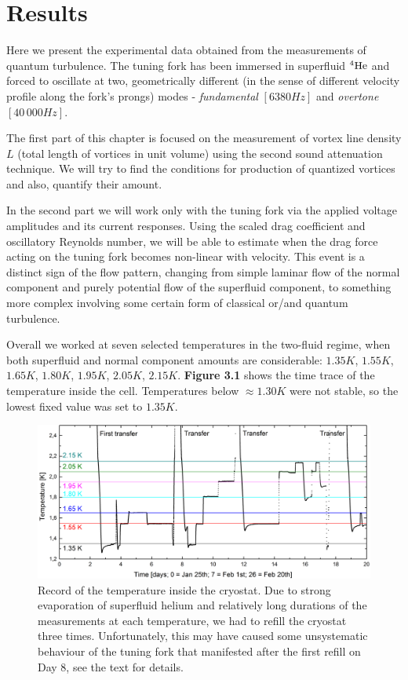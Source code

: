 \newpage

\chapter{Results}

Here we present the experimental data obtained from the measurements of quantum turbulence. The tuning fork has been immersed in superfluid ${}^4\mathrm{He}$ and forced to oscillate at two, geometrically different (in the sense of different velocity profile along the fork's prongs) modes - \textit{fundamental} $ [6380\unit{Hz}] $ and \textit{overtone} $ [40\,000\unit{Hz}] $.

The first part of this chapter is focused on the measurement of vortex line density $ L $ (total length of vortices in unit volume) using the second sound attenuation technique. We will try to find the conditions for production of quantized vortices and also, quantify their amount.

In the second part we will work only with the tuning fork via the applied voltage amplitudes and its current responses. Using the scaled drag coefficient and oscillatory Reynolds number, we will be able to estimate when the drag force acting on the tuning fork becomes non-linear with velocity. This event is a distinct sign of the flow pattern, changing from simple laminar flow of the normal component and purely potential flow of the superfluid component, to something more complex involving some certain form of classical or/and quantum turbulence.

Overall we worked at seven selected temperatures in the two-fluid regime, when both superfluid and normal component amounts are considerable: $ 1.35\unit{K} $, $ 1.55\unit{K} $, $ 1.65\unit{K} $, $ 1.80\unit{K} $, $ 1.95\unit{K} $, $ 2.05\unit{K} $, $ 2.15\unit{K} $.  {\sffamily\textbf{Figure 3.1}} shows the time trace of the temperature inside the cell. Temperatures below $\approx 1.30\unit{K} $ were not stable, so the lowest fixed value was set to $ 1.35\unit{K} $.  


\begin{figure}[h!]
	\centering
	\includegraphics[width=1\textwidth]{graphs/diary}
	\caption{Record of the temperature inside the cryostat. Due to strong evaporation of superfluid helium and relatively long durations of the measurements at each temperature, we had to refill the cryostat three times. Unfortunately, this may have caused some unsystematic behaviour of the tuning fork that manifested after the first refill on Day 8, see the text for details.}
\end{figure}


